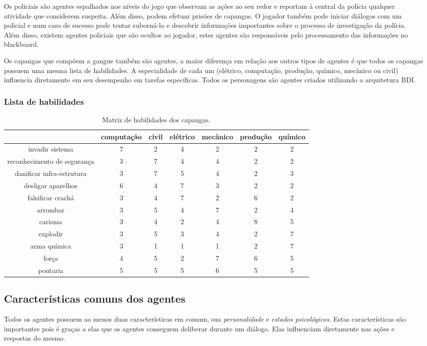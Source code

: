 Os policiais são agentes espalhados nos níveis do jogo que observam as ações ao seu redor e reportam à central da polícia qualquer atividade que considerem suspeita. Além disso, podem efetuar prisões de capangas. O jogador também pode iniciar diálogos com um policial e num caso de sucesso pode tentar suborná-lo e descobrir informações importantes sobre o processo de investigação da polícia. Além disso, existem agentes policiais que são ocultos ao jogador, estes agentes são responsáveis pelo processamento das informações no blackboard.

Os capangas que compõem a gangue também são agentes, a maior diferença em relação aos outros tipos de agentes é que todos os capangas possuem uma mesma lista de habilidades. A especialidade de cada um (elétrico, computação, produção, químico, mecânico ou civil) influencia diretamente em seu desempenho em tarefas específicas.
Todos os personagens são agentes criados utilizando a arquitetura BDI.

\subsubsection{Lista de habilidades}
\begin{table}\footnotesize
\begin{tabular}{ccccccc}
& computação & civil & elétrico & mecânico & produção & químico \\
\hline
invadir sistema & 7&2&4&2&2&2\\
reconhecimento de segurança & 3&7&4&4&2&2\\
danificar infra-estrutura &3&7&5&4&2&3\\
desligar aparelhos &6&4&7&3&2&2\\
falsificar crachá &3&4&7&2&6&2\\
arrombar &3&5&4&7&2&4\\
carisma &3&4&2&4&8&5\\
explodir &3&5&3&4&2&7\\
arma química &3&1&1&1&2&7\\
força &4&5&2&7&6&5\\
pontaria &5&5&5&6&5&5\\
\hline
\end{tabular}
\caption{Matriz de habilidades dos capangas.}\label{tab:habilidadesCapang}
\end{table}


\subsection{Características comuns dos agentes}
Todos os agentes possuem ao menos duas características em comum, sua \emph{personalidade} e  \emph{estados psicológicos}. Estas características são importantes pois é graças a elas que os agentes conseguem deliberar durante um diálogo. Elas influenciam diretamente nas ações e respostas do mesmo.

